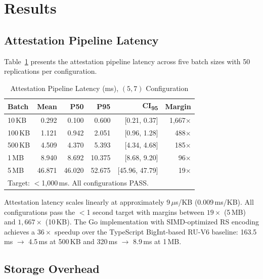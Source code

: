 
\section{Results}
\label{sec:results}

\subsection{Attestation Pipeline Latency}

Table~\ref{tab:attestation} presents the attestation pipeline latency
across five batch sizes with 50 replications per configuration.

\begin{table}[t]
\centering
\caption{Attestation Pipeline Latency (ms), $(5,7)$ Configuration}
\label{tab:attestation}
\begin{tabular}{@{}lrrrrr@{}}
\toprule
\textbf{Batch} & \textbf{Mean} & \textbf{P50} & \textbf{P95} & \textbf{CI\textsubscript{95}} & \textbf{Margin} \\
\midrule
10\,KB  & 0.292  & 0.100  & 0.600  & [0.21, 0.37]  & 1{,}667$\times$ \\
100\,KB & 1.121  & 0.942  & 2.051  & [0.96, 1.28]  & 488$\times$     \\
500\,KB & 4.509  & 4.370  & 5.393  & [4.34, 4.68]  & 185$\times$     \\
1\,MB   & 8.940  & 8.692  & 10.375 & [8.68, 9.20]  & 96$\times$      \\
5\,MB   & 46.871 & 46.020 & 52.675 & [45.96, 47.79] & 19$\times$     \\
\bottomrule
\multicolumn{6}{l}{\footnotesize Target: $<$1{,}000\,ms. All configurations PASS.} \\
\end{tabular}
\end{table}

Attestation latency scales linearly at approximately 9\,$\mu$s/KB
(0.009\,ms/KB). All configurations pass the $<$1 second target with
margins between $19\times$ (5\,MB) and $1{,}667\times$ (10\,KB). The
Go implementation with SIMD-optimized RS encoding achieves a
$36\times$ speedup over the TypeScript BigInt-based RU-V6 baseline:
163.5\,ms $\rightarrow$ 4.5\,ms at 500\,KB and 320\,ms $\rightarrow$
8.9\,ms at 1\,MB.

\subsection{Storage Overhead}

